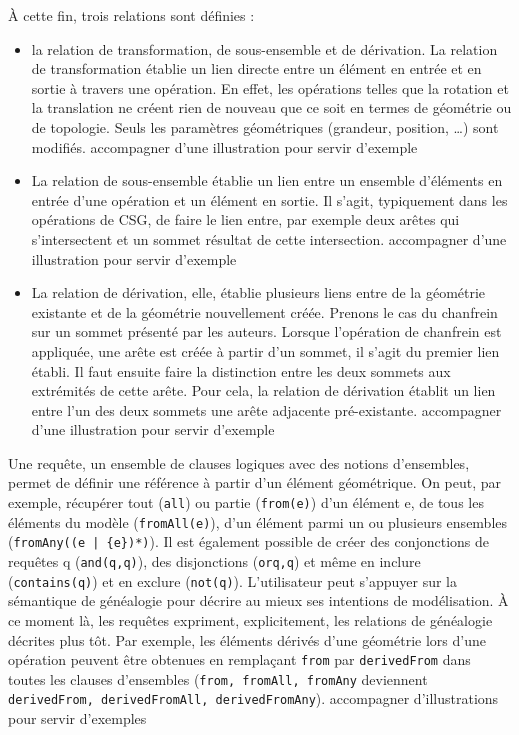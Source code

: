\documentclass[11pt, a4paper]{article}
\begin{document}
À cette fin, trois relations sont définies :
\begin{itemize}
	\item la relation de transformation, de sous-ensemble et de dérivation. La
	      relation de transformation établie un lien directe entre un élément en
	      entrée et en sortie à travers une opération. En effet, les opérations
	      telles que la rotation et la translation ne créent rien de nouveau que
	      ce soit en termes de géométrie ou de topologie. Seuls les paramètres
	      géométriques (grandeur, position, …) sont modifiés.
	      {\color{red}accompagner d'une illustration pour servir d'exemple}
	\item La relation de sous-ensemble établie un lien entre un ensemble
	      d'éléments en entrée d'une opération et un élément en sortie. Il s'agit,
	      typiquement dans les opérations de CSG, de faire le lien entre, par
	      exemple deux arêtes qui s'intersectent et un sommet résultat de cette
	      intersection.
		      {\color{red}accompagner d'une illustration pour servir d'exemple}
	\item La relation de dérivation, elle, établie plusieurs liens entre de la
	      géométrie existante et de la géométrie nouvellement créée. Prenons le
	      cas du chanfrein sur un sommet présenté par les auteurs. Lorsque
	      l'opération de chanfrein est appliquée, une arête est créée à partir
	      d'un sommet, il s'agit du premier lien établi. Il faut ensuite faire la
	      distinction entre les deux sommets aux extrémités de cette arête. Pour
	      cela, la relation de dérivation établit un lien entre l'un des deux
	      sommets une arête adjacente pré-existante.
	      {\color{red}accompagner d'une illustration pour servir d'exemple}
\end{itemize}


Une requête, un ensemble de clauses logiques avec des notions d'ensembles,
permet de définir une référence à partir d'un élément géométrique. %
On peut, par exemple, récupérer tout (\texttt{all}) ou partie (\texttt{from(e)})
d'un élément e, de tous les éléments du modèle (\texttt{fromAll(e)}), d'un
élément parmi un ou plusieurs ensembles (\texttt{fromAny((e | \{e\})*)}). Il est
également possible de créer des conjonctions de requêtes q (\texttt{and(q,q)}),
des disjonctions (\texttt{or{q,q}}) et même en inclure (\texttt{contains(q)}) et
en exclure (\texttt{not(q)}). %
L'utilisateur peut s'appuyer sur la sémantique de généalogie pour décrire au
mieux ses intentions de modélisation. À ce moment là, les requêtes expriment,
explicitement, les relations de généalogie décrites plus tôt. Par exemple, les
éléments dérivés d'une géométrie lors d'une opération peuvent être obtenues en
remplaçant \texttt{from} par \texttt{derivedFrom} dans toutes les clauses
d'ensembles (\texttt{from, fromAll, fromAny} deviennent \texttt{derivedFrom,
	derivedFromAll, derivedFromAny}). %
	{\color{red}accompagner d'illustrations pour servir d'exemples}
\end{document}

